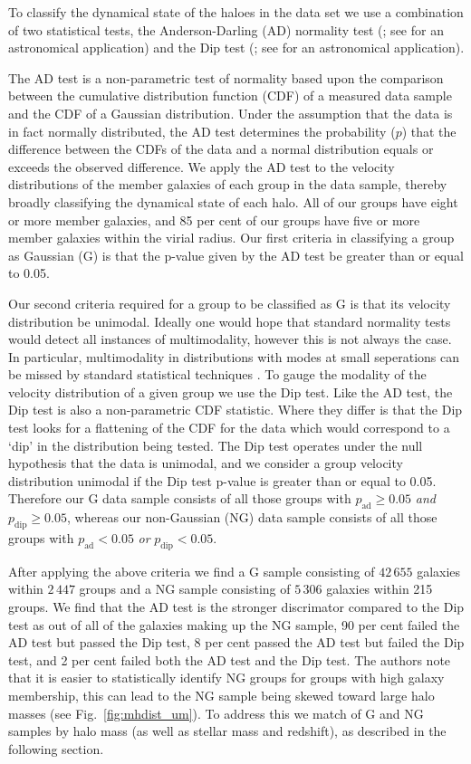 \documentclass[a4paper,fleqn,usenatbib]{mnras}
\begin{document}
To classify the dynamical state of the haloes in the data set we use a
combination of two statistical tests, the Anderson-Darling (AD)
normality test (\citealt{anderson1952}; see \citealt{hou2009, hou2013}
for an astronomical application) and the Dip test
(\citealt{hartigan1985}; see \citealt{ribeiro2013} for an astronomical
application).
\par
The AD test is a non-parametric test of normality based
upon the comparison between the cumulative distribution function (CDF) of a
measured data sample and the CDF of a Gaussian distribution.  Under
the assumption that the data is in fact normally distributed, the AD
test determines the probability ($p$) that the difference between
the CDFs of the data and a normal distribution equals or exceeds the
observed difference.  We apply the AD test to the velocity
distributions of the member galaxies of each group in the data sample,
thereby broadly classifying the dynamical state of each halo.  All of
our groups have eight or more member galaxies, and 85 per cent of our
groups have five or more member galaxies within the virial radius.  Our
first criteria in classifying a group as Gaussian (G) is that the p-value given
by the AD test be greater than or equal to 0.05.
\par
Our second criteria required for a
group to be classified as G is that its velocity distribution be
unimodal.  Ideally one would
hope that standard normality tests would detect all instances of
multimodality, however this is not always the case.  In particular,
multimodality in distributions with modes at small seperations
can be missed by standard statistical techniques \citep{ashman1994}. To
gauge the modality of the velocity distribution of a given group we
use the Dip test.  Like the AD test, the Dip test is also a
non-parametric CDF statistic.  Where they differ is that the Dip test
looks for a flattening of the CDF for the data which would correspond
to a `dip' in the distribution being tested.  The Dip test operates
under the null hypothesis that the data is unimodal, and we consider a
group velocity distribution unimodal if the Dip test p-value is
greater than or equal to 0.05.  Therefore our G data sample consists
of all those groups with $p_{\text{ad}} \ge 0.05$
\emph{and} $p_{\text{dip}} \ge 0.05$, whereas our non-Gaussian (NG) data
sample consists of all those groups with $p_{\text{ad}} < 0.05$
\emph{or} $p_{\text{dip}} < 0.05$.
\par
After applying the above criteria we find a G sample consisting of
$42\,655$ galaxies within $2\,447$ groups and a NG sample consisting of $5\,306$
galaxies within 215 groups.  We find that the AD test is the stronger discrimator
compared to the Dip test as out of all of the galaxies making up the
NG sample, 90 per cent failed the AD test but passed the Dip test, 8
per cent passed the AD test but failed the Dip test, and 2 per cent
failed both the AD test and the Dip test.  The authors note that it is
easier to statistically identify NG groups for groups with high
galaxy membership, this can lead to the NG sample being skewed toward
large halo masses (see Fig.~\ref{fig:mhdist_um}).  To address this we
match of G and NG samples by halo mass (as well as stellar mass and
redshift), as described in the following section.
\end{document}
